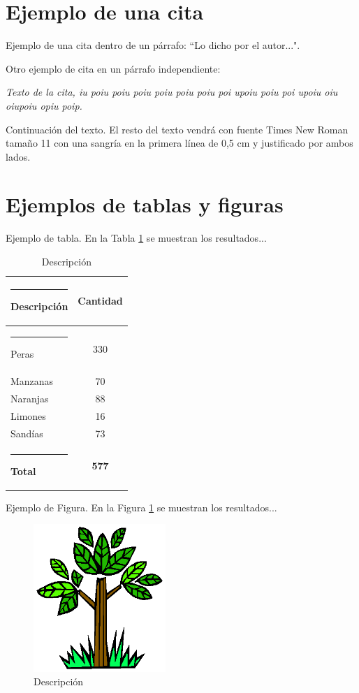 \documentclass[a4paper,11pt,twocolumn,twoside]{article}
\begin{document}
\section{Ejemplo de una cita}

Ejemplo de una cita dentro de un párrafo: ``Lo dicho por el
autor...".

Otro ejemplo de cita en un párrafo independiente:

\parbox{6.5cm}{\textit{Texto de la cita, iu poiu poiu poiu poiu poiu poiu poi
upoiu poiu poi upoiu oiu oiupoiu opiu poip.}}

Continuación del texto. El resto del texto vendrá con fuente
Times New Roman tamaño 11 con una sangría en la primera línea de
0,5 cm y justificado por ambos lados.


\section{Ejemplos de tablas y figuras}

Ejemplo de tabla. En la Tabla \ref{tabla1} se muestran los
resultados...
\begin{table} [h]
\begin{center}
\begin{tabular} {|l|c|}
  \hline\rule{-2pt}{15pt}
  {\bf Descripción} & {\bf Cantidad}\\
  \hline\rule{-4pt}{10pt}
  Peras & 330\\
  Manzanas & 70\\
  Naranjas &  88\\
  Limones & 16\\
  Sandías & 73\\
  \hline\rule{-2pt}{10pt}
  {\bf Total}  & {\bf 577}\\
  \hline
\end{tabular}
\end{center}
\caption{\label{tabla1}Descripción}
\end{table}

Ejemplo de Figura. En la Figura \ref{figura1} se muestran los
resultados...

\begin{figure}[h]
  \centering
  \includegraphics[width=5cm,clip]{ejem1.eps}
  \caption{Descripción}
  \label{figura1}
\end{figure}
\end{document}
